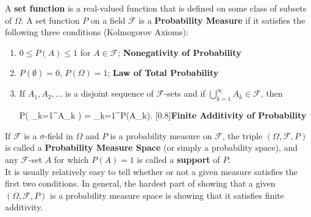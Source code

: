 	      		 \quad
	      		
	      		A \textbf{set function} is a real-valued function that is defined on some class of subsets of $\Omega$. A set function $P$ on a field $\mathcal{F}$ is a \textbf{Probability Measure} if it satisfies the following three conditions (Kolmogorov Axioms):
	      		\vspace{2ex}
	      		\begin{enumerate}[label=\textbf{\roman*.}, topsep=0pt, itemsep=-3pt]
	      			\item $0 \leq P(A) \leq 1$ for $A \in \mathcal{F}$; \quad  \textbf{\footnotesize Nonegativity of Probability}
	      			\item $P(\emptyset) = 0$, $P(\Omega) = 1$; \quad \textbf{\footnotesize Law of Total Probability}
	      			\item If $A_1, A_2, \dots$ is a disjoint sequence of $\mathcal{F}$-sets and if $\bigcup_{k=1}^\infty A_k \in \mathcal{F}$, then
	      			      \begin{UNequation}
	      			      	P\left( \bigcup_{k=1}^\infty A_k \right) = \sum_{k=1}^\infty P(A_k). \quad  \scalebox{0.8}[0.8]{\textbf{\footnotesize Finite Additivity of Probability}}
	      			      \end{UNequation}
	      		\end{enumerate}
	      		\vspace{2ex}
	      		
	      		If $\mathcal{F}$ is a $\sigma$-field in $\Omega$ and $P$ is a probability measure on $\mathcal{F}$, the triple $(\Omega, \mathcal{F}, P)$ is called a \textbf{Probability Measure Space} (or simply a probability space), and any $\mathcal{F}$-set $A$ for which $P(A)=1$ is called a \textbf{support} of $P$.\\[10pt]
    
                It is usually relatively easy to tell whether or not a given measure satisfies the first two conditions. In general, the hardest part of showing that a given $(\Omega, \mathcal{F}, P)$ is a probability measure space is showing that it satisfies finite additivity.\\ 
                
